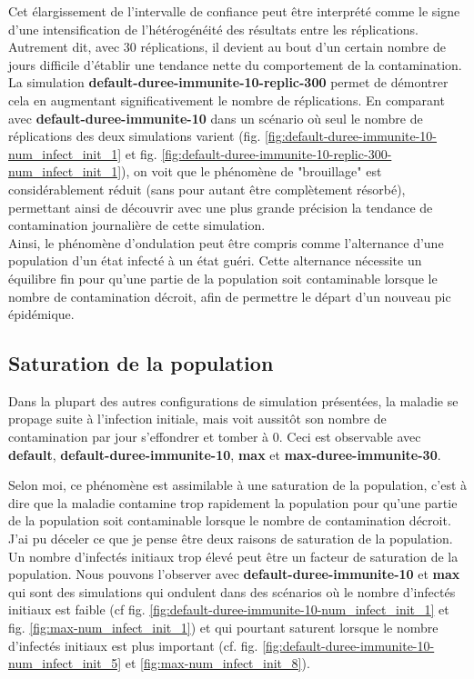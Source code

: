 \documentclass[12pt,french,titlepage]{article}
\begin{document}
Cet élargissement de l'intervalle de confiance peut être interprété comme le signe d'une intensification de l'hétérogénéité des résultats entre les réplications. Autrement dit, avec 30 réplications, il devient au bout d'un certain nombre de jours difficile d'établir une tendance nette du comportement de la contamination. La simulation \textbf{default-duree-immunite-10-replic-300} permet de démontrer cela en augmentant significativement le nombre de réplications. En comparant avec \textbf{default-duree-immunite-10} dans un scénario où seul le nombre de réplications des deux simulations varient (fig. \ref{fig:default-duree-immunite-10-num_infect_init_1} et fig. \ref{fig:default-duree-immunite-10-replic-300-num_infect_init_1}), on voit que le phénomène de "brouillage" est considérablement réduit (sans pour autant être complètement résorbé), permettant ainsi de découvrir avec une plus grande précision la tendance de contamination journalière de cette simulation.\\

Ainsi, le phénomène d'ondulation peut être compris comme l'alternance d'une population d'un état infecté à un état guéri. Cette alternance nécessite un équilibre fin pour qu'une partie de la population soit contaminable lorsque le nombre de contamination décroit, afin de permettre le départ d'un nouveau pic épidémique.


\subsection{Saturation de la population}
Dans la plupart des autres configurations de simulation présentées, la maladie se propage suite à l'infection initiale, mais voit aussitôt son nombre de contamination par jour s'effondrer et tomber à 0. Ceci est observable avec  \textbf{default}, \textbf{default-duree-immunite-10}, \textbf{max} et \textbf{max-duree-immunite-30}.

Selon moi, ce phénomène est assimilable à une saturation de la population, c'est à dire que la maladie contamine trop rapidement la population pour qu'une partie de la population soit contaminable lorsque le nombre de contamination décroit. J'ai pu déceler ce que je pense être deux raisons de saturation de la population.\\

Un nombre d'infectés initiaux trop élevé peut être un facteur de saturation de la population. Nous pouvons l'observer avec \textbf{default-duree-immunite-10} et \textbf{max} qui sont des simulations qui ondulent dans des scénarios où le nombre d'infectés initiaux est faible (cf fig. \ref{fig:default-duree-immunite-10-num_infect_init_1} et fig. \ref{fig:max-num_infect_init_1}) et qui pourtant saturent lorsque le nombre d'infectés initiaux est plus important (cf. fig. \ref{fig:default-duree-immunite-10-num_infect_init_5} et \ref{fig:max-num_infect_init_8}).\\
\end{document}
